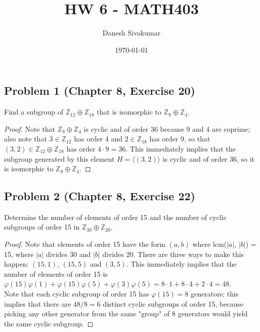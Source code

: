 \documentclass{article}
\title{HW 6 - MATH403}
\author{Danesh Sivakumar}
\date\today
\begin{document}
\maketitle 

\subsection*{Problem 1 (Chapter 8, Exercise 20)}
Find a subgroup of $\mathbb{Z}_{12} \oplus \mathbb{Z}_{18}$ that is isomorphic to $\mathbb{Z}_9 \oplus \mathbb{Z}_4$.

\begin{proof}
Note that $\mathbb{Z}_9 \oplus \mathbb{Z}_4$ is cyclic and of order 36 because 9 and 4 are coprime; also note that $3 \in \mathbb{Z}_{12}$ has order 4 and $2 \in \mathbb{Z}_{18}$ has order 9, so that $(3, 2) \in \mathbb{Z}_{12} \oplus \mathbb{Z}_{18}$ has order $4 \cdot 9 = 36$. This immediately implies that the subgroup generated by this element $H = \langle (3, 2) \rangle$ is cyclic and of order 36, so it is isomorphic to $\mathbb{Z}_9 \oplus \mathbb{Z}_4$.
\end{proof}


\subsection*{Problem 2 (Chapter 8, Exercise 22)}
Determine the number of elements of order 15 and the number of cyclic subgroups of order 15 in $\mathbb{Z}_{30} \oplus \mathbb{Z}_{20}$.

\begin{proof}
Note that elements of order 15 have the form $(a, b)$ where lcm($|a|$, $|b|$) = 15, where $|a|$ divides 30 and $|b|$ divides 20. There are three ways to make this happen: $(15, 1)$, $(15, 5)$ and $(3, 5)$. This immediately implies that the number of elements of order 15 is $\varphi(15)\varphi(1) + \varphi(15)\varphi(5) + \varphi(3)\varphi(5) = 8\cdot 1 + 8\cdot 4 + 2\cdot 4 = 48$. \\
Note that each cyclic subgroup of order 15 has $\varphi(15) = 8$ generators; this implies that there are $48/8 = 6$ distinct cyclic subgroups of order 15, because picking any other generator from the same "group" of 8 generators would yield the same cyclic subgroup.
\end{proof}
\end{document}
